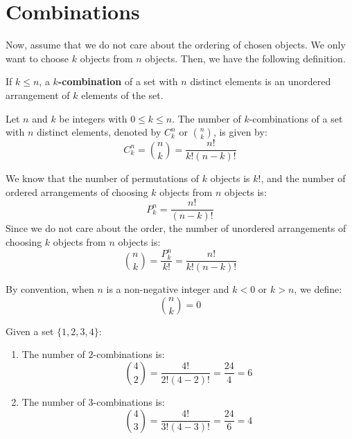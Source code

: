 \documentclass{huhtakm-template-book-v2}
\begin{document}
\section{Combinations}
    Now, assume that we do not care about the ordering of chosen objects. We only want to choose $k$ objects from $n$ objects. Then, we have the following definition.
    \begin{defn}
        If $k \leq n$, a \textbf{$k$-combination} of a set with $n$ distinct elements is an unordered arrangement of $k$ elements of the set.
    \end{defn}
    \begin{thm}
        Let $n$ and $k$ be integers with $0 \leq k \leq n$. The number of $k$-combinations of a set with $n$ distinct elements, denoted by $C_{k}^{n}$ or $\binom{n}{k}$, is given by:
        \begin{equation*}
            C_{k}^{n} = \binom{n}{k} = \frac{n!}{k!(n-k)!}
        \end{equation*}
    \end{thm}
    \begin{proofing}
        We know that the number of permutations of $k$ objects is $k!$, and the number of ordered arrangements of choosing $k$ objects from $n$ objects is:
        \begin{equation*}
            P_{k}^{n} = \frac{n!}{(n-k)!}
        \end{equation*}
        Since we do not care about the order, the number of unordered arrangements of choosing $k$ objects from $n$ objects is:
        \begin{equation*}
            \binom{n}{k} = \frac{P_{k}^{n}}{k!} = \frac{n!}{k!(n-k)!}
        \end{equation*}
    \end{proofing}
    \begin{rem}
        By convention, when $n$ is a non-negative integer and $k < 0$ or $k > n$, we define:
        \begin{equation*}
            \binom{n}{k} = 0
        \end{equation*}
    \end{rem}
    \begin{eg}
        Given a set $\{1,2,3,4\}$:
        \begin{enumerate}
            \item The number of $2$-combinations is:
            \begin{equation*}
                \binom{4}{2} = \frac{4!}{2!(4-2)!} = \frac{24}{4} = 6
            \end{equation*}
            \item The number of $3$-combinations is:
            \begin{equation*}
                \binom{4}{3} = \frac{4!}{3!(4-3)!} = \frac{24}{6} = 4
            \end{equation*}
        \end{enumerate}
    \end{eg}
\end{document}
